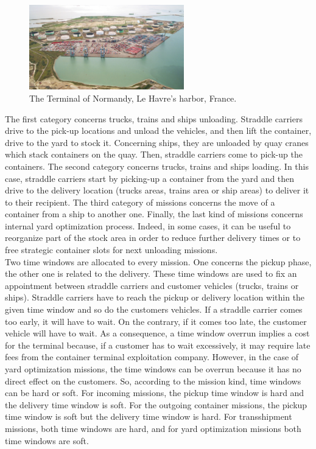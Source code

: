 \documentclass[a4paper,12pt]{article}
\begin{document}
\begin{figure}[ht]
  \begin{center}
  \includegraphics[width=0.6\textwidth]{Figures/terminalOfNormandy}
  \caption{The Terminal of Normandy, Le Havre's harbor, France.}
\end{center}
\end{figure}


The first category concerns trucks, trains and ships unloading. Straddle carriers drive to the pick-up locations and unload the vehicles, and then lift the container, drive to the yard to stock it. Concerning ships, they are unloaded by quay cranes which stack containers on the quay. Then, straddle carriers come to pick-up the containers.
The second category concerns trucks, trains and ships loading. In this case, straddle carriers start by picking-up a container from the yard and then drive to the delivery location (trucks areas, trains area or ship areas) to deliver it to their recipient. 
The third category of missions concerns the move of a container from a ship to another one.
Finally, the last kind of missions concerns internal yard optimization process. Indeed, in some cases, it can be useful to reorganize part of the stock area in order to reduce further delivery times or to free strategic container slots for next unloading missions.\\

Two time windows are allocated to every mission. One concerns the pickup phase, the other one is related to the delivery. These time windows are used to fix an appointment between straddle carriers and customer vehicles (trucks, trains or ships). Straddle carriers have to reach the pickup or delivery location within the given time window and so do the customers vehicles. If a straddle carrier comes too early, it will have to wait. On the contrary, if it comes too late, the customer vehicle will have to wait. As a consequence, a time window overrun implies a cost for the terminal because, if a customer has to wait excessively, it may require late fees from the container terminal exploitation company. However, in the case of yard optimization missions, the time windows can be overrun because it has no direct effect on the customers. So, according to the mission kind, time windows can be hard or soft. For incoming missions, the pickup time window is hard and the delivery time window is soft. For the outgoing container missions, the pickup time window is soft but the delivery time window is hard. For transshipment missions, both time windows are hard, and for yard optimization missions both time windows are soft. 
\end{document}
